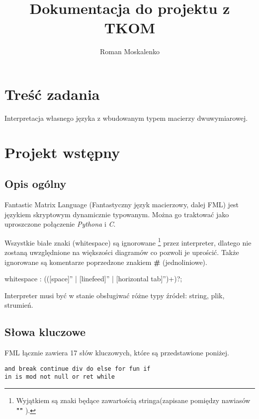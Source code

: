 \documentclass[12pt,a4paper]{article}
\title{Dokumentacja do projektu z TKOM}
\author{Roman Moskalenko}
\date{}
\begin{document}
\maketitle
\tableofcontents
\pagebreak

\section{Treść zadania}
Interpretacja własnego języka z wbudowanym typem macierzy dwuwymiarowej.

\section{Projekt wstępny}
\subsection{Opis ogólny}

Fantastic Matrix Language (Fantastyczny język macierzowy, dalej FML) jest językiem skryptowym dynamicznie typowanym. Można go traktować jako uproszczone połączenie \emph{Pythona} i \emph{C}. 

Wszystkie białe znaki (whitespace) są ignorowane
\footnote{Wyjątkiem są znaki będące zawartością stringa(zapisane pomiędzy nawiasów \textbf{"" }).}
 przez interpreter, dlatego nie zostaną uwzględnione na większości diagramów co pozwoli je uprościć. Także ignorowane są komentarze poprzedzone znakiem \textbf{\#} (jednoliniowe).

\begin{rail}

  whitespace : (([space]'' | [linefeed]'' | [horizontal tab]'')+)?;  

\end{rail}

Interpreter musi być w stanie obsługiwać różne typy źródeł: string, plik, strumień.

\pagebreak

%
%
\subsection{Słowa kluczowe}

FML łącznie zawiera 17 słów kluczowych, które są przedstawione poniżej.

\begin{lstlisting}
and break continue div do else for fun if 
in is mod not null or ret while
\end{lstlisting}
\end{document}
